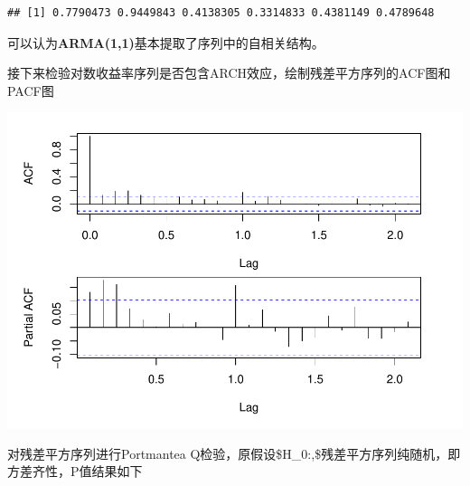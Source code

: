 \documentclass[
]{article}
\newenvironment{Shaded}{\begin{snugshade}}{\end{snugshade}}
\newcommand{\DataTypeTok}[1]{\textcolor[rgb]{0.13,0.29,0.53}{#1}}
\newcommand{\DecValTok}[1]{\textcolor[rgb]{0.00,0.00,0.81}{#1}}
\newcommand{\FloatTok}[1]{\textcolor[rgb]{0.00,0.00,0.81}{#1}}
\newcommand{\KeywordTok}[1]{\textcolor[rgb]{0.13,0.29,0.53}{\textbf{#1}}}
\newcommand{\NormalTok}[1]{#1}
\newcommand{\OperatorTok}[1]{\textcolor[rgb]{0.81,0.36,0.00}{\textbf{#1}}}
\newcommand{\StringTok}[1]{\textcolor[rgb]{0.31,0.60,0.02}{#1}}
\begin{document}
\begin{verbatim}
## [1] 0.7790473 0.9449843 0.4138305 0.3314833 0.4381149 0.4789648
\end{verbatim}

可以认为\textbf{ARMA(1,1)}基本提取了序列中的自相关结构。

接下来检验对数收益率序列是否包含ARCH效应，绘制残差平方序列的ACF图和PACF图

\begin{Shaded}
\end{Shaded}

\begin{center}
	\includegraphics{ass_4_files/figure-latex/unnamed-chunk-6-1.pdf}
\end{center}

对残差平方序列进行Portmantea
Q检验，原假设\$H\_0:,\$残差平方序列纯随机，即方差齐性，P值结果如下
\end{document}
